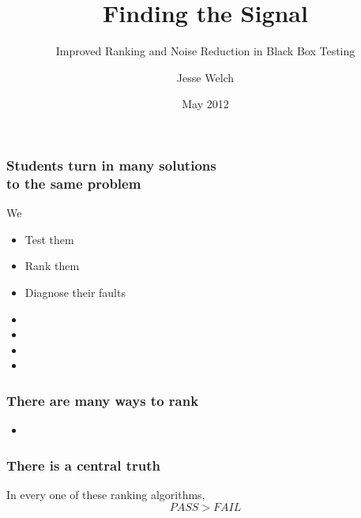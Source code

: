 \documentclass[svgnames,14pt]{beamer}
\title{Finding the Signal}
\subtitle{Improved Ranking and Noise Reduction in Black Box Testing}
\author{Jesse Welch}
\date{May 2012}
\newcommand\fail{\mathit{FAIL}}
\newcommand\pass{\mathit{PASS}}
\theoremstyle{definition}
\begin{document}
\begin{frame}
\maketitle
\end{frame}


\begin{frame}
\frametitle{Students turn in many solutions \\ to the same problem}
We 
\begin{itemize}
\item Test them \only<2->{\textbf{cheaply}}
\item Rank them 
\item Diagnose their faults 
\end{itemize}
\end{frame}

\begin{frame}
\begin{itemize}
\frametitle{Overview}
\item {}
\item {}
\item {}
\item {}
\end{itemize}
\end{frame}

\begin{frame}
\frametitle{There are many ways to rank}
\begin{itemize}
\item {}
\end{itemize}
\end{frame}

\begin{frame}
\frametitle{There is a central truth}
In every one of these ranking algorithms,
$$\pass>\fail$$
\end{frame}
\end{document}
